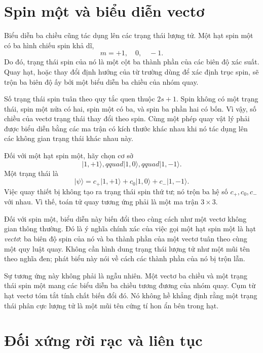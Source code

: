 \section{Spin một và biểu diễn vectơ}

Biểu diễn ba chiều cũng tác dụng lên các trạng thái lượng tử. Một hạt spin một có ba hình chiếu spin khả dĩ,
\begin{equation}
m=+1,\quad 0,\quad -1.
\end{equation}
Do đó, trạng thái spin của nó là một cột ba thành phần của các biên độ xác suất. Quay hạt, hoặc thay đổi định hướng của từ trường dùng để xác định trục spin, sẽ trộn ba biên độ ấy bởi một biểu diễn ba chiều của nhóm quay.

Số trạng thái spin tuân theo quy tắc quen thuộc \(2s+1\). Spin không có một trạng thái, spin một nửa có hai, spin một có ba, và spin ba phần hai có bốn. Vì vậy, số chiều của vectơ trạng thái thay đổi theo spin. Cùng một phép quay vật lý phải được biểu diễn bằng các ma trận có kích thước khác nhau khi nó tác dụng lên các không gian trạng thái khác nhau này.

Đối với một hạt spin một, hãy chọn cơ sở
\begin{equation}
\lvert 1,+1\rangle,qquad
\lvert 1,0\rangle,qquad
\lvert 1,-1\rangle.
\end{equation}
Một trạng thái là
\begin{equation}
\lvert\psi\rangle
=c_{+}\lvert1,+1\rangle+c_0\lvert1,0\rangle+c_{-}\lvert1,-1\rangle.
\end{equation}
Việc quay thiết bị không tạo ra trạng thái spin thứ tư; nó trộn ba hệ số \(c_+,c_0,c_-\) với nhau. Vì thế, toán tử quay tương ứng phải là một ma trận \(3\times3\).

Đối với spin một, biểu diễn này biến đổi theo cùng cách như một vectơ không gian thông thường. Đó là ý nghĩa chính xác của việc gọi một hạt spin một là hạt \emph{vectơ}: ba biên độ spin của nó và ba thành phần của một vectơ tuân theo cùng một quy luật quay. Không cần hình dung trạng thái lượng tử như một mũi tên theo nghĩa đen; phát biểu này nói về cách các thành phần của nó bị trộn lẫn.

Sự tương ứng này không phải là ngẫu nhiên. Một vectơ ba chiều và một trạng thái spin một mang các biểu diễn ba chiều tương đương của nhóm quay. Cụm từ {hạt vectơ} tóm tắt tính chất biến đổi đó. Nó không hề khẳng định rằng một trạng thái phân cực lượng tử là một mũi tên cứng tí hon ẩn bên trong hạt.

\section{Đối xứng rời rạc và liên tục}


